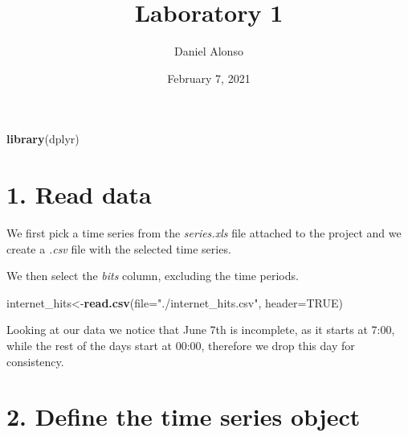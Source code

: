 \documentclass[]{article}
\title{Laboratory 1}
\author{Daniel Alonso}
\date{February 7, 2021}
\newenvironment{Shaded}{\begin{snugshade}}{\end{snugshade}}
\newcommand{\DataTypeTok}[1]{\textcolor[rgb]{0.13,0.29,0.53}{#1}}
\newcommand{\DecValTok}[1]{\textcolor[rgb]{0.00,0.00,0.81}{#1}}
\newcommand{\KeywordTok}[1]{\textcolor[rgb]{0.13,0.29,0.53}{\textbf{#1}}}
\newcommand{\NormalTok}[1]{#1}
\newcommand{\OperatorTok}[1]{\textcolor[rgb]{0.81,0.36,0.00}{\textbf{#1}}}
\newcommand{\OtherTok}[1]{\textcolor[rgb]{0.56,0.35,0.01}{#1}}
\newcommand{\StringTok}[1]{\textcolor[rgb]{0.31,0.60,0.02}{#1}}
\begin{document}
\maketitle

\begin{Shaded}
\begin{Highlighting}[]
\KeywordTok{library}\NormalTok{(dplyr)}
\end{Highlighting}
\end{Shaded}

\hypertarget{read-data}{%
\section{1. Read data}\label{read-data}}

We first pick a time series from the \emph{series.xls} file attached to
the project and we create a \emph{.csv} file with the selected time
series.

We then select the \emph{bits} column, excluding the time periods.

\begin{Shaded}
\begin{Highlighting}[]
\NormalTok{internet_hits<-}\KeywordTok{read.csv}\NormalTok{(}\DataTypeTok{file=}\StringTok{"./internet_hits.csv"}\NormalTok{, }\DataTypeTok{header=}\OtherTok{TRUE}\NormalTok{)}
\end{Highlighting}
\end{Shaded}

Looking at our data we notice that June 7th is incomplete, as it starts
at 7:00, while the rest of the days start at 00:00, therefore we drop
this day for consistency.

\begin{Shaded}
\end{Shaded}

\hypertarget{define-the-time-series-object}{%
\section{2. Define the time series
object}\label{define-the-time-series-object}}
\end{document}
